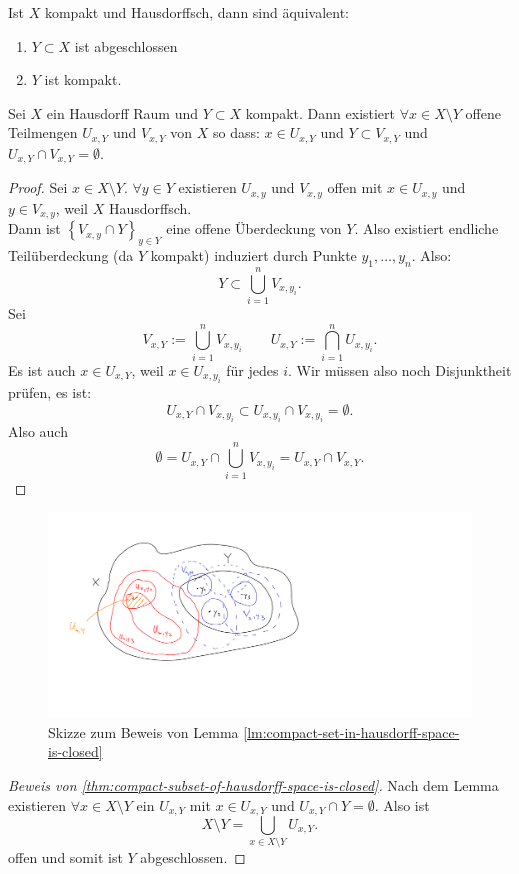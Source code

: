 \begin{corollary}
    Ist $X$ kompakt und Hausdorffsch, dann sind äquivalent:
    \label{thm:compact-iff-closed}
\begin{enumerate}[1)]
        \item $Y\subset X$ ist abgeschlossen
        \item $Y$ ist kompakt.
    \end{enumerate}
\end{corollary}
\begin{lemma}
    Sei $X$ ein Hausdorff Raum und  $Y\subset X$ kompakt. Dann existiert $\forall x\in X\setminus Y$ offene Teilmengen $U_{x,Y}$ und $V_{x,Y}$ von $X$ so dass:  $x\in U_{x,Y}$ und $Y\subset V_{x,Y}$ und $U_{x,Y} \cap V_{x,Y} = \emptyset$.
    \label{lm:compact-set-in-hausdorff-space-is-closed}
\end{lemma}
\begin{proof}
    Sei $x\in X\setminus Y$. $\forall y\in Y$ existieren $U_{x,y}$ und $V_{x,y}$ offen mit $x\in U_{x,y}$ und $y\in V_{x,y}$, weil $X$ Hausdorffsch. \\
    Dann ist  $\left \{V_{x,y} \cap Y\right\} _{y\in Y}$ eine offene Überdeckung von $Y$. Also existiert endliche Teilüberdeckung (da  $Y$ kompakt) induziert durch Punkte  $y_1,\ldots,y_n$. Also:
    \[
    Y\subset \bigcup_{i=1}^n V_{x,y_i}
    .\] 
    Sei
    \[
    V_{x,Y} := \bigcup_{i=1}^n V_{x,y_i} \qquad U_{x,Y} := \bigcap_{i=1}^n U_{x,y_i} 
    .\] 
    Es ist auch $x\in U_{x,Y}$, weil $x\in U_{x,y_i}$ für jedes $i$. Wir müssen also noch Disjunktheit prüfen, es ist:
     \[
    U_{x,Y} \cap V_{x,y_i} \subset U_{x,y_i} \cap V_{x,y_i} = \emptyset
    .\] 
    Also auch
    \[
        \emptyset=    U_{x,Y} \cap \bigcup_{i=1}^n V_{x,y_i} = U_{x,Y} \cap V_{x,Y}
    .\]
\end{proof}
    \begin{figure}[H]
    \includegraphics[scale=0.4]{figures/Lemma5.5.pdf}
    \caption{Skizze zum Beweis von Lemma \ref{lm:compact-set-in-hausdorff-space-is-closed}}
\end{figure}
\begin{proof}[Beweis von \ref{thm:compact-subset-of-hausdorff-space-is-closed}]
    Nach dem Lemma existieren $\forall x\in X \setminus Y$ ein $U_{x,Y}$ mit $x\in U_{x,Y}$ und $U_{x,Y} \cap Y = \emptyset$. Also ist
    \[
    X \setminus Y = \bigcup_{x\in X \setminus Y} U_{x,Y}
    .\] 
    offen und somit ist $Y$ abgeschlossen.
\end{proof}


